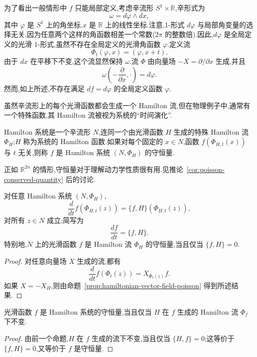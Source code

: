 为了看出一般情形中 $f$ 只能局部定义,考虑辛流形 $S^1\times\mathbb R$,辛形式为
\[
 \omega=d\varphi\wedge dx,
\]
其中 $\varphi$ 是 $S^1$ 上的角坐标,$x$ 是 $\mathbb R$ 上的线性坐标.注意,1-形式 $d\varphi$ 与局部角变量的选择无关,因为任意两个这样的角函数相差一个常数($2\pi$ 的整数倍).因此,$d\varphi$ 是全局定义的光滑 1-形式,虽然不存在全局定义的光滑角函数 $\varphi$.定义流
\[
 \Phi_t(\varphi,x)=(\varphi,x+t).
\]
由于 $dx$ 在平移下不变,这个流显然保持 $\omega$.流 $\Phi$ 由向量场 $-X=\partial/\partial x$ 生成,并且
\[
 \omega\left(-\frac{\partial}{\partial x},\cdot\right)=d\varphi.
\]
然而,如上所述,不存在满足 $df=d\varphi$ 的全局定义函数 $\varphi$.

虽然辛流形上的每个光滑函数都会生成一个 Hamilton 流,但在物理例子中,通常有一个特殊函数,其 Hamilton 流被视为系统的“时间演化”.

\begin{definition}\label{def:hamiltonian-system}
Hamilton 系统是一个辛流形 $N$,连同一个由光滑函数 $H$ 生成的特殊 Hamilton 流 $\Phi_H$;$H$ 称为系统的 Hamilton 函数.如果对每个固定的 $x\in N$,函数 $f(\Phi_{H,t}(x))$ 与 $t$ 无关,则称 $f$ 是 Hamilton 系统 $(N,\Phi_H)$ 的守恒量.
\end{definition}

正如 $\mathbb R^{2n}$ 的情形,守恒量对于理解动力学性质很有用.见推论~\ref{cor:poisson-conserved-quantity} 后的讨论.

\begin{proposition}\label{prop:hamiltonian-conservation}
对任意 Hamilton 系统 $(N,\Phi_H)$,
\[
 \frac d{dt}f(\Phi_{H,t}(z))
 =\{f,H\}(\Phi_{H,t}(z)),
\]
对所有 $z\in N$ 成立;简写为
\[
 \frac{df}{dt}=\{f,H\}.
\]
特别地,$N$ 上的光滑函数 $f$ 是 Hamilton 流 $\Phi_H$ 的守恒量,当且仅当 $\{f,H\}=0$.
\end{proposition}

\begin{proof}
对任意向量场 $X$ 生成的流,都有
\[
 \frac d{dt}f(\Phi_t(z))=X_{\Phi_t(z)}f.
\]
如果 $X=-X_H$,则由命题~\ref{prop:hamiltonian-vector-field-poisson} 得到所述结果.
\end{proof}

\begin{proposition}\label{prop:conserved-hamiltonian-invariance}
光滑函数 $f$ 是 Hamilton 系统的守恒量,当且仅当 $H$ 在 $f$ 生成的 Hamilton 流 $\Phi_f$ 下不变.
\end{proposition}

\begin{proof}
由前一个命题,$H$ 在 $f$ 生成的流下不变,当且仅当 $\{H,f\}=0$;这等价于 $\{f,H\}=0$,又等价于 $f$ 是守恒量.
\end{proof}

